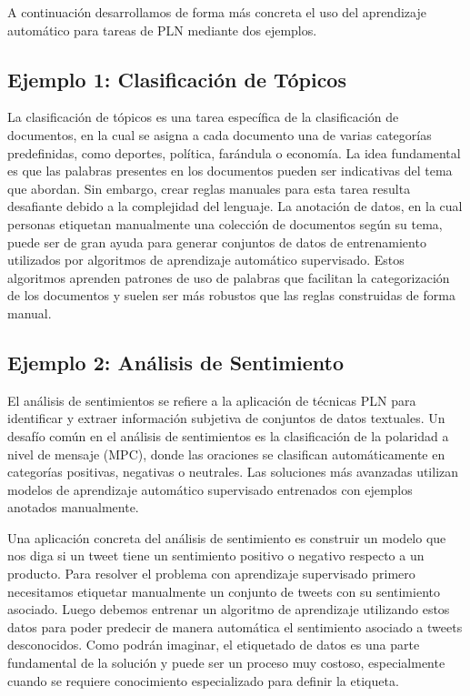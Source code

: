A continuación desarrollamos de forma más concreta el uso del aprendizaje automático para tareas de PLN mediante dos ejemplos.

\subsection{Ejemplo 1: Clasificación de Tópicos}

La clasificación de tópicos es una tarea específica de la clasificación de documentos, en la cual se asigna a cada documento una de varias categorías predefinidas, como deportes, política, farándula o economía. La idea fundamental es que las palabras presentes en los documentos pueden ser indicativas del tema que abordan. Sin embargo, crear reglas manuales para esta tarea resulta desafiante debido a la complejidad del lenguaje. La anotación de datos, en la cual personas etiquetan manualmente una colección de documentos según su tema, puede ser de gran ayuda para generar conjuntos de datos de entrenamiento utilizados por algoritmos de aprendizaje automático supervisado. Estos algoritmos aprenden patrones de uso de palabras que facilitan la categorización de los documentos y suelen ser más robustos que las reglas construidas de forma manual.


\subsection{Ejemplo 2: Análisis de Sentimiento}

El análisis de sentimientos se refiere a la aplicación de técnicas PLN para identificar y extraer información subjetiva de conjuntos de datos textuales. Un desafío común en el análisis de sentimientos es la clasificación de la polaridad a nivel de mensaje (MPC), donde las oraciones se clasifican automáticamente en categorías positivas, negativas o neutrales. Las soluciones más avanzadas utilizan modelos de aprendizaje automático supervisado entrenados con ejemplos anotados manualmente.

Una aplicación concreta del análisis de sentimiento es construir un modelo que nos diga si un tweet tiene un sentimiento positivo o negativo respecto a un producto. Para resolver el problema con aprendizaje supervisado primero necesitamos etiquetar manualmente un conjunto de tweets con su sentimiento asociado. Luego debemos entrenar un algoritmo de aprendizaje utilizando estos datos para poder predecir de manera automática el sentimiento asociado a tweets desconocidos. Como podrán imaginar, el etiquetado de datos es una parte fundamental de la solución y puede ser un proceso muy costoso, especialmente cuando se requiere conocimiento especializado para definir la etiqueta.

